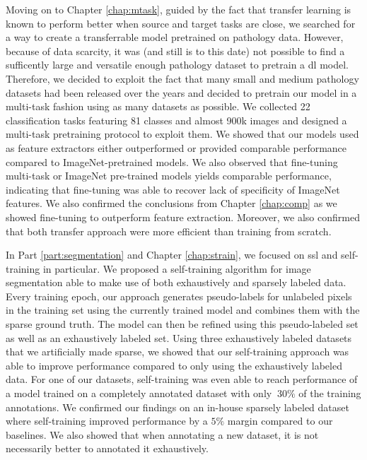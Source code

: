 Moving on to Chapter \ref{chap:mtask}, guided by the fact that transfer learning is known to perform better when source and target tasks are close, we searched for a way to create a transferrable model pretrained on pathology data. However, because of data scarcity, it was (and still is to this date) not possible to find a sufficently large and versatile enough pathology dataset to pretrain a \acrlong{dl} model. Therefore, we decided to exploit the fact that many small and medium pathology datasets had been released over the years and decided to pretrain our model in a multi-task fashion using as many datasets as possible. We collected 22 classification tasks featuring 81 classes and almost 900k images and designed a multi-task pretraining protocol to exploit them. We showed that our models used as feature extractors either outperformed or provided comparable performance compared to ImageNet-pretrained models. We also observed that fine-tuning multi-task or ImageNet pre-trained models yields comparable performance, indicating that fine-tuning was able to recover lack of specificity of ImageNet features. We also confirmed the conclusions from Chapter \ref{chap:comp} as we showed fine-tuning to outperform feature extraction. Moreover, we also confirmed that both transfer approach were more efficient than training from scratch.

In Part \ref{part:segmentation} and Chapter \ref{chap:strain}, we focused on \acrlong{ssl} and self-training in particular. We proposed a self-training algorithm for image segmentation able to make use of both exhaustively and sparsely labeled data. Every training epoch, our approach generates pseudo-labels for unlabeled pixels in the training set using the currently trained model and combines them with the sparse ground truth. The model can then be refined using this pseudo-labeled set as well as an exhaustively labeled set. Using three exhaustively labeled datasets that we artificially made sparse, we showed that our self-training approach was able to improve performance compared to only using the exhaustively labeled data. For one of our datasets, self-training was even able to reach performance of a model trained on a completely annotated dataset with only $~30\%$ of the training annotations. We confirmed our findings on an in-house sparsely labeled dataset where self-training improved performance by a $5\%$ margin compared to our baselines. We also showed that when annotating a new dataset, it is not necessarily better to annotated it exhaustively. 

